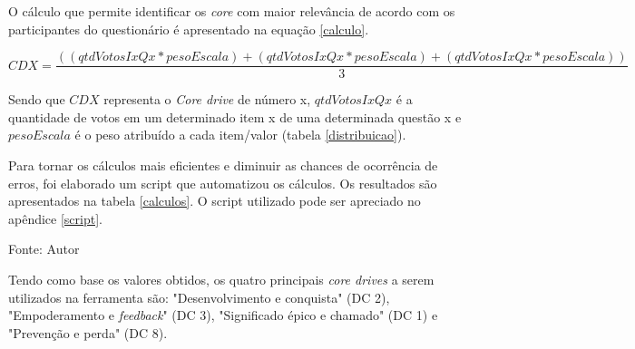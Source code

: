 O cálculo que permite identificar os \textit{core} com maior relevância de acordo com os participantes do questionário é apresentado 
na equação \ref{calculo}.

\begin{equation}
	\label{calculo}
	\scriptstyle CDX = \frac{((qtdVotosIxQx * pesoEscala) + (qtdVotosIxQx * pesoEscala) + (qtdVotosIxQx * pesoEscala)) }{3}
\end{equation}

Sendo que $CDX$ representa o \textit{Core drive} de número x, $qtdVotosIxQx$ é a quantidade de votos em um determinado 
item x de uma determinada questão x e $pesoEscala$ é o peso atribuído a cada item/valor (tabela \ref{distribuicao}).

Para tornar os cálculos mais eficientes e diminuir as chances de ocorrência de erros, foi elaborado um script que automatizou
os cálculos. Os resultados são apresentados na tabela \ref{calculos}. O script utilizado pode ser apreciado no apêndice \ref{script}.

\begin{table}[h]
	\centering
	\caption{Resultados dos cálculos de relevância.}
	\label{calculos}
	Fonte: Autor
\end{table}

Tendo como base os valores obtidos, os quatro principais \textit{core drives} a serem utilizados na ferramenta são: "Desenvolvimento e conquista" (DC 2), "Empoderamento
e \textit{feedback}" (DC 3), "Significado épico e chamado" (DC 1) e "Prevenção e perda" (DC 8).

